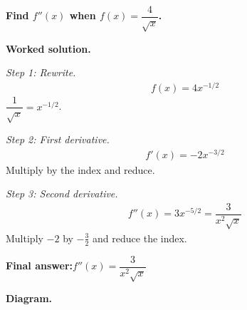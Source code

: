\documentclass[11pt]{article}
\newcommand{\question}[1]{\par\medskip\noindent\textbf{#1}\par}
\begin{document}
\question{Find \( f''(x) \) when \( f(x) = \dfrac{4}{\sqrt{x}} \).}

\textbf{Worked solution.}

\textit{Step 1: Rewrite.}
\[\begin{gathered}
f(x) = 4x^{-1/2}
\end{gathered}\]
\( \dfrac{1}{\sqrt{x}} = x^{-1/2} \).

\textit{Step 2: First derivative.}
\[\begin{gathered}
f'(x) = -2x^{-3/2}
\end{gathered}\]
Multiply by the index and reduce.

\textit{Step 3: Second derivative.}
\[\begin{gathered}
f''(x) = 3x^{-5/2} = \dfrac{3}{x^2\sqrt{x}}
\end{gathered}\]
Multiply \( -2 \) by \( -\tfrac{3}{2} \) and reduce the index.

\begin{answerbox}
\textbf{Final answer:}\quad \(\displaystyle  f''(x) = \dfrac{3}{x^2\sqrt{x}} \)
\end{answerbox}
\textbf{Diagram.}
\end{document}
